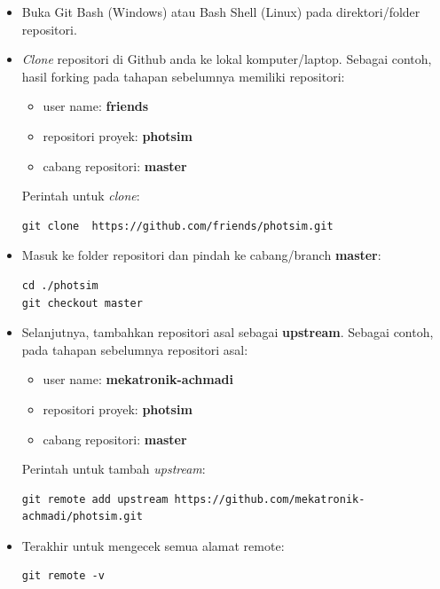 \documentclass[12pt]{article}
\begin{document}
	\begin{itemize}
		\item Buka Git Bash (Windows) atau Bash Shell (Linux) pada direktori/folder repositori.
		\item \textit{Clone} repositori di Github anda ke lokal komputer/laptop.
		Sebagai contoh, hasil forking pada tahapan sebelumnya memiliki repositori:
		\begin{itemize}
			\item user name: \textbf{friends}
			\item repositori proyek: \textbf{photsim}
			\item cabang repositori: \textbf{master}
		\end{itemize}
	
		Perintah untuk \textit{clone}:
		\begin{verbatim}
git clone  https://github.com/friends/photsim.git
		\end{verbatim}
		
		\item Masuk ke folder repositori dan pindah ke cabang/branch \textbf{master}:
		\begin{verbatim}
cd ./photsim
git checkout master
		\end{verbatim}
		
		\item Selanjutnya, tambahkan repositori asal sebagai \textbf{upstream}.
		Sebagai contoh, pada tahapan sebelumnya repositori asal: 
		\begin{itemize}
			\item user name: \textbf{mekatronik-achmadi}
			\item repositori proyek: \textbf{photsim}
			\item cabang repositori: \textbf{master}
		\end{itemize}
		Perintah untuk tambah \textit{upstream}:
		\begin{verbatim}
git remote add upstream https://github.com/mekatronik-achmadi/photsim.git
		\end{verbatim}	
	
		\item Terakhir untuk mengecek semua alamat remote:
		\begin{verbatim}
git remote -v
		\end{verbatim}
	\end{itemize} 
\end{document}
